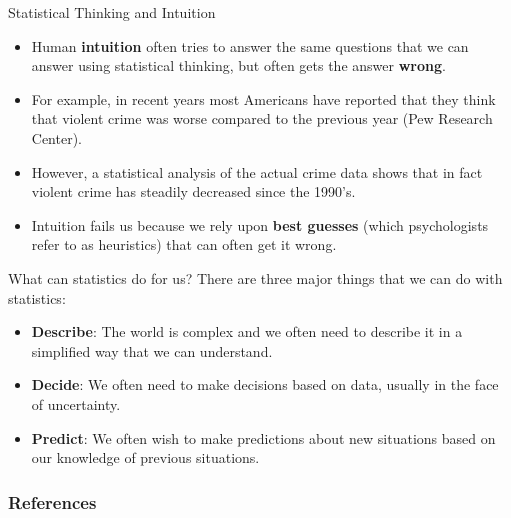 \documentclass[handout]{beamer}
\begin{document}
\begin{frame}{Statistical Thinking and Intuition}

\scriptsize{
\begin{itemize}
\item Human \textbf{intuition} often tries to answer the same questions that we can answer using statistical thinking, but often gets the answer \textbf{wrong}. 
\item For example, in recent years most Americans have reported that they think that violent crime was worse compared to the previous year (Pew Research Center). 
\item However, a statistical analysis of the actual crime data shows that in fact violent crime has steadily decreased since the 1990’s. 
\item Intuition fails us because we rely upon \textbf{best guesses} (which psychologists refer to as heuristics) that can often get it wrong. \cite{poldrack2019statistical}


\end{itemize}

}
 
\end{frame}


\begin{frame}{What can statistics do for us?}
There are three major things that we can do with statistics:

\begin{itemize}
\item \textbf{Describe}: The world is complex and we often need to describe it in a simplified way that we can understand.
\item \textbf{Decide}: We often need to make decisions based on data, usually in the face of uncertainty.
\item \textbf{Predict}: We often wish to make predictions about new situations based on our knowledge of previous situations.



\end{itemize}


 
\end{frame}





\begin{frame}[allowframebreaks]\scriptsize
\frametitle{References}


%
\end{frame}  









\end{document}
